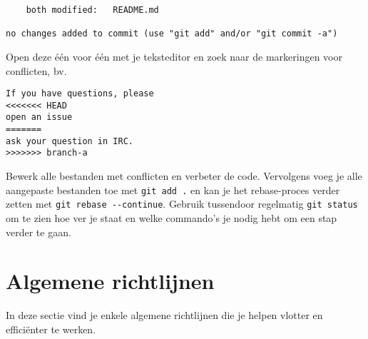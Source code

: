 \begin{enumerate}
\begin{verbatim}
    both modified:   README.md

no changes added to commit (use "git add" and/or "git commit -a")
\end{verbatim}

Open deze één voor één met je teksteditor en zoek naar de markeringen voor conflicten, bv.

\begin{verbatim}
If you have questions, please
<<<<<<< HEAD
open an issue
=======
ask your question in IRC.
>>>>>>> branch-a
\end{verbatim}

Bewerk alle bestanden met conflicten en verbeter de code. Vervolgens voeg je alle aangepaste bestanden toe met \verb|git add .| en kan je het rebase-proces verder zetten met \verb|git rebase --continue|. Gebruik tussendoor regelmatig \texttt{git status} om te zien hoe ver je staat en welke commando's je nodig hebt om een stap verder te gaan.

\end{enumerate}

\section{Algemene richtlijnen}%
\label{sec:algemene_richtlijnen}

In deze sectie vind je enkele algemene richtlijnen die je helpen vlotter en efficiënter te werken.

